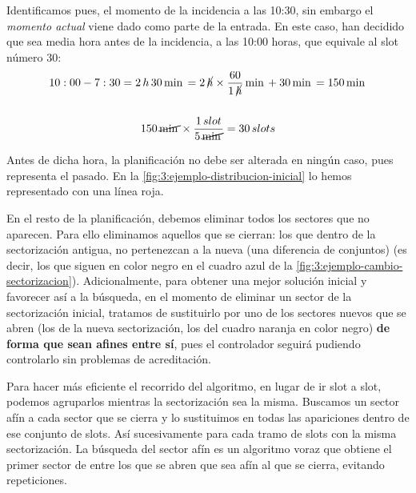 Identificamos pues, el momento de la incidencia a las 10:30, sin embargo el \textit{momento actual} viene dado como parte de la entrada. En este caso, han decidido que sea media hora antes de la incidencia, a las 10:00 horas, que equivale al slot número 30:
\begin{gather*}
10:00 - 7:30 = 2 \,h \,30 \,\min = 2 \, \cancel{h} \times \frac{60}{1 \,\cancel{h}}\,\min + 30\,\min = 150\,\min\\\\
150 \,\cancel{\min} \times \frac{1\,slot}{5\,\cancel{\min}} = 30\,slots
\end{gather*}

Antes de dicha hora, la planificación no debe ser alterada en ningún caso, pues representa el pasado. En la 
\autoref{fig:3:ejemplo-distribucion-inicial} lo hemos representado con una línea roja. 

En el resto de la planificación, debemos eliminar todos los sectores que no aparecen. Para ello eliminamos aquellos que se cierran: los que dentro de la sectorización antigua, no pertenezcan a la nueva (una diferencia de conjuntos) (es decir, los que siguen en color negro en el cuadro azul de la \autoref{fig:3:ejemplo-cambio-sectorizacion}). 
Adicionalmente, para obtener una mejor solución inicial y favorecer así a la búsqueda, en el momento de eliminar un sector de la sectorización inicial, tratamos de sustituirlo por uno de los sectores nuevos que se abren (los de la nueva sectorización, los del cuadro naranja en color negro) \textbf{de forma que sean afines entre sí}, pues el controlador seguirá pudiendo controlarlo sin problemas de acreditación.

Para hacer más eficiente el recorrido del algoritmo, en lugar de ir slot a slot, podemos agruparlos mientras la sectorización sea la misma. Buscamos un sector afín a cada sector que se cierra y lo sustituimos en todas las apariciones dentro de ese conjunto de slots. Así sucesivamente para cada tramo de slots con la misma sectorización. 
La búsqueda del sector afín es un algoritmo voraz que obtiene el primer sector de entre los que se abren que sea afín al que se cierra, evitando repeticiones.

